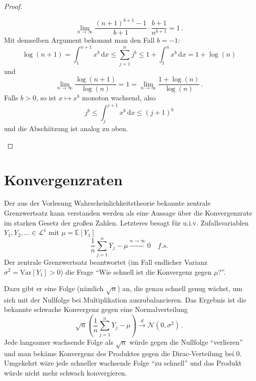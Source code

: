 \documentclass[ngerman,a4paper,11pt]{scrartcl}
\newcommand{\EE}{\mathbb{E}}
\renewcommand{\ll}{\mathcal{L}}
\newcommand{\nn}{\mathcal{N}}
\newcommand{\expect}[1]{\EE[#1]}
\newcommand{\dvar}[1]{\,\mathrm{d}#1}
\newcommand{\Var}[1]{\mathrm{Var}[#1]}
\begin{document}
\begin{proof}
\begin{thmlist}
\begin{equation*}
 \lim_{n\to\infty} \frac{(n+1)^{b+1}-1}{b+1}\cdot\frac{b+1}{n^{b+1}}=1\,.
\end{equation*}
Mit demselben Argument bekommt man den Fall $b=-1$:
\begin{equation*}
   \log(n+1)=\int_1^{n+1}x^b\dvar{x}\leq\sum_{j=1}^nj^b\leq 1+\int_1^nx^b\dvar{x}=1+\log(n)
\end{equation*}
und
\begin{equation*}
 \lim_{n\to\infty}\frac{\log(n+1)}{\log(n)} = 1 = \lim_{n\to\infty}\frac{1+\log(n)}{\log(n)}\,.
\end{equation*}
  Falls $b>0$, so ist $x\mapsto x^b$ monoton wachsend, also
  \begin{equation*}
   j^b\leq\int_j^{j+1}x^b\dvar{x}\leq (j+1)^b
  \end{equation*}
  und die Abschätzung ist analog zu oben.
  \end{thmlist}
\end{proof}
\section{Konvergenzraten}
Der aus der Vorlesung Wahrscheinlichkeitstheorie bekannte zentrale Grenzwertsatz
kann verstanden werden als eine Aussage über die Konvergenzrate im starken
Gesetz der großen Zahlen. Letzteres besagt für u.i.v. Zufallsvariablen
$Y_1,Y_2,\dotsc\in\ll^1$ mit $\mu =\expect{Y_1}$
\begin{equation*}
  \frac{1}{n}\sum_{j=1}^nY_j-\mu\overset{n\to\infty}{\longrightarrow} 0\quad\textit{f.s.} 
\end{equation*}
Der zentrale Grenzwertsatz beantwortet (im Fall endlicher Varianz
$\sigma^2=\Var{Y_1}>0$) die Frage
  \enquote{Wie schnell ist die Konvergenz gegen $\mu$?}.

Dazu gibt er eine Folge (nämlich $\sqrt{n}$) an, die genau schnell genug wächst,
um sich mit der Nullfolge bei Multiplikation auszubalancieren. Das Ergebnis ist die
bekannte schwache Konvergenz gegen eine Normalverteilung  
\begin{equation*}
 \sqrt{n}\left(\frac{1}{n}\sum_{j=1}^nY_j-\mu\right)\overset{d}{\to}\nn(0,\sigma^2)\,. 
\end{equation*}
Jede langsamer wachsende Folge als $\sqrt{n}$ würde gegen die Nullfolge
\enquote{verlieren} und man bekäme Konvergenz des Produktes gegen die
Dirac-Verteilung bei 0. Umgekehrt wäre jede schneller wachsende Folge
\enquote{zu schnell} und das Produkt würde nicht mehr schwach konvergieren. 
\end{document}

